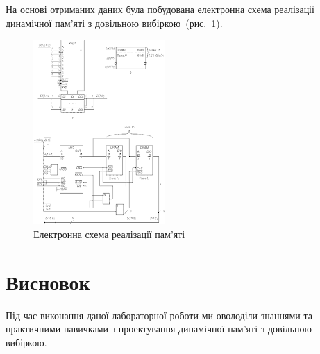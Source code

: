 \documentclass[a4paper, oneside, DIV = 12, 12pt, headings = normal]{scrartcl}
\begin{document}
			На основі отриманих даних була побудована електронна схема реалізації динамічної пам'\-яті з довільною вибіркою~(рис.~\ref{fig:memory-schematic-result}).
			\begin{figure}[!htbp]
				\centering
					\includegraphics[]{./assets/02.png}
				\caption{Електронна схема реалізації пам'\-яті}
				\label{fig:memory-schematic-result}
			\end{figure}

		\section{Висновок}
			Під час виконання даної лабораторної роботи ми оволоділи знаннями та практичними навичками з проектування динамічної пам'\-яті з довільною вибіркою.
\end{document}

